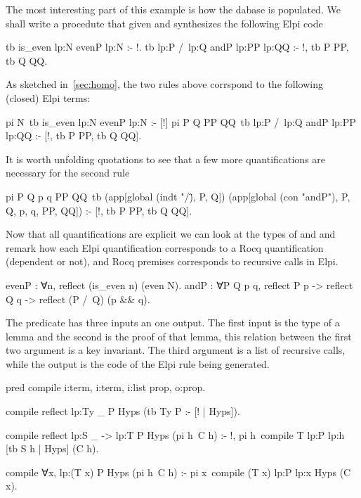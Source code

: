 \documentclass[a4paper, 11pt]{book}
\begin{document}
The most interesting part of this example is how the dabase is populated.
We shall write a  procedute that given 
and  synthesizes the following Elpi code

\begin{elpicode}
tb {{ is_even lp:N }} {{ evenP lp:N }} :- !.
tb {{ lp:P /\ lp:Q }} {{ andP lp:PP lp:QQ }} :- !, tb P PP, tb Q QQ.
\end{elpicode}

As sketched in~\ref{sec:homo}, the two rules above corrspond to the
following (closed) Elpi terms:

\begin{elpicode}
pi N\ tb {{ is_even lp:N }} {{ evenP lp:N }} :- [!]
pi P Q PP QQ\ tb {{ lp:P /\ lp:Q }} {{ andP lp:PP lp:QQ }} :-
  [!, tb P PP, tb Q QQ].
\end{elpicode}

It is worth unfolding quotations to see that a few more quantifications are
necessary for the second rule

\begin{elpicode}
pi P Q p q PP QQ\
  tb (app[global (indt "/\"), P, Q])
     (app[global (con "andP"), P, Q, p, q, PP, QQ]) :-
  [!, tb P PP, tb Q QQ].
\end{elpicode}
  

Now that all quantifications are explicit we can look at the types of
\rocq{evenP} and \rocq{andP} and remark how each \elpi{pi}
Elpi quantification corresponds to a Rocq quantification (dependent or not),
and Rocq premises corresponds to recursive calls in Elpi.

\begin{rocqcode}
evenP : ∀n, reflect (is_even n) (even N).
andP : ∀P Q p q,
  reflect P p -> reflect Q q -> reflect (P /\ Q) (p && q).
\end{rocqcode}

The  predicate has three inputs an one output.
The first input is the type of a lemma and the second is the proof of that
lemma, this relation between the first two argument is a key invariant.
The third argument is a list of recursive calls, while the output is
the code of the Elpi rule being generated.

\begin{elpicode}
pred compile i:term, i:term, i:list prop, o:prop.

compile {{ reflect lp:Ty _ }} P Hyps (tb Ty P :- [! | Hyps]).

compile {{ reflect lp:S _ -> lp:T }} P Hyps (pi h\ C h) :- !,
  pi h\ compile T {{ lp:P lp:h }} [tb S h | Hyps] (C h).

compile {{ ∀x, lp:(T x) }} P Hyps (pi h\ C h) :-
  pi x\ compile (T x) {{ lp:P lp:x }} Hyps (C x).
\end{elpicode}
\end{document}
